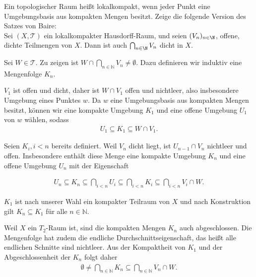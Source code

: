 \begin{exercise}
Ein topologischer Raum heißt lokalkompakt, wenn jeder Punkt eine Umgebungsbasis
aus kompakten Mengen besitzt. Zeige die folgende Version des Satzes von Baire: \\
Sei $(X,\mathcal{T})$ ein lokalkompakter Hausdorff-Raum, und seien $(V_n)_{n \in \N}$,
offene, dichte Teilmengen von $X$. Dann ist auch $\bigcap_{n \in \N} V_n$ dicht in $X$.
\end{exercise}
\begin{solution}
  Sei $W \in \mathcal{T}.$ Zu zeigen ist $W \cap \bigcap_{n \in \mathbb{N}} V_n \neq \emptyset.$ Dazu definieren wir induktiv eine Mengenfolge $K_n$.

  $V_1$ ist offen und dicht, daher ist $W \cap V_1$ offen und nichtleer, also insbesondere Umgebung eines Punktes $w$. Da $w$ eine Umgebungsbasis aus kompakten Mengen besitzt, können wir eine kompakte Umgebung $K_1$ und eine offene Umgebung $U_1$ von $w$ wählen, sodass
  \begin{align*}
    U_1 \subseteq K_1 \subseteq W \cap V_1.
  \end{align*}

  Seien $K_i, i < n$ bereits definiert. Weil $V_n$ dicht liegt, ist $U_{n-1} \cap V_n$ nichtleer und offen. Insbesondere enthält diese Menge eine kompakte Umgebung $K_n$ und eine offene Umgebung $U_n$ mit der Eigenschaft

  \begin{align}
      U_n \subseteq K_n \subseteq \bigcap_{i < n} U_i
      \subseteq \bigcap_{i < n} K_i \subseteq \bigcap_{i < n} V_i \cap W.
  \end{align}

  $K_1$ ist nach unserer Wahl ein kompakter Teilraum von $X$ und nach Konstruktion gilt $K_n \subseteq K_1$ für alle $n \in \mathbb{N}$.

  Weil $X$ ein $T_2$-Raum ist, sind die kompakten Mengen $K_n$ auch abgeschlossen. Die Mengenfolge hat zudem die endliche Durchschnittseigenschaft, das heißt alle endlichen Schnitte sind nichtleer. Aus der Kompaktheit von $K_1$ und der Abgeschlossenheit der $K_n$ folgt daher
  \begin{align}
      \emptyset \neq \bigcap_{n \in \mathbb{N}} K_n \subseteq \bigcap_{n \in \mathbb{N}} V_n \cap W.
  \end{align}
\end{solution}
